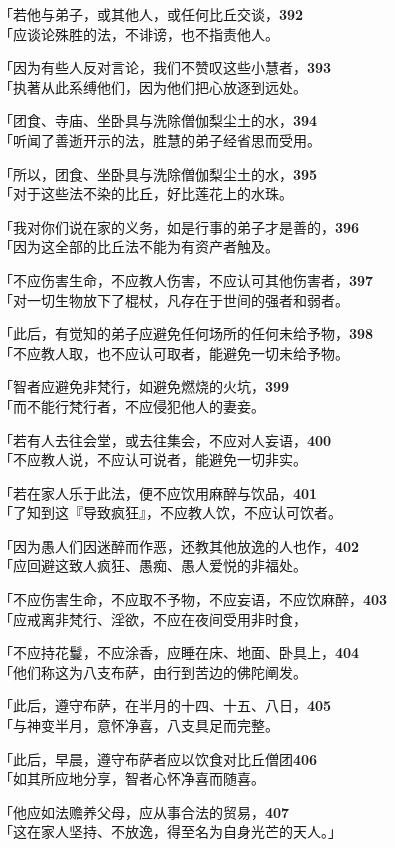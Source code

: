 「若他与弟子，或其他人，或任何比丘交谈，\hfill{\grayfootnotesize \textbf{392}} \\
「应谈论殊胜的法，不诽谤，也不指责他人。


「因为有些人反对言论，我们不赞叹这些小慧者，\hfill{\grayfootnotesize \textbf{393}} \\
「执著从此系缚他们，因为他们把心放逐到远处。


「团食、寺庙、坐卧具与洗除僧伽梨尘土的水，\hfill{\grayfootnotesize \textbf{394}} \\
「听闻了善逝开示的法，胜慧的弟子经省思而受用。


「所以，团食、坐卧具与洗除僧伽梨尘土的水，\hfill{\grayfootnotesize \textbf{395}} \\
「对于这些法不染的比丘，好比莲花上的水珠。


「我对你们说在家的义务，如是行事的弟子才是善的，\hfill{\grayfootnotesize \textbf{396}} \\
「因为这全部的比丘法不能为有资产者触及。


「不应伤害生命，不应教人伤害，不应认可其他伤害者，\hfill{\grayfootnotesize \textbf{397}} \\
「对一切生物放下了棍杖，凡存在于世间的强者和弱者。


「此后，有觉知的弟子应避免任何场所的任何未给予物，\hfill{\grayfootnotesize \textbf{398}} \\
「不应教人取，也不应认可取者，能避免一切未给予物。


「智者应避免非梵行，如避免燃烧的火坑，\hfill{\grayfootnotesize \textbf{399}} \\
「而不能行梵行者，不应侵犯他人的妻妾。


「若有人去往会堂，或去往集会，不应对人妄语，\hfill{\grayfootnotesize \textbf{400}} \\
「不应教人说，不应认可说者，能避免一切非实。


「若在家人乐于此法，便不应饮用麻醉与饮品，\hfill{\grayfootnotesize \textbf{401}} \\
「了知到这『导致疯狂』，不应教人饮，不应认可饮者。


「因为愚人们因迷醉而作恶，还教其他放逸的人也作，\hfill{\grayfootnotesize \textbf{402}} \\
「应回避这致人疯狂、愚痴、愚人爱悦的非福处。


「不应伤害生命，不应取不予物，不应妄语，不应饮麻醉，\hfill{\grayfootnotesize \textbf{403}} \\
「应戒离非梵行、淫欲，不应在夜间受用非时食，


「不应持花鬘，不应涂香，应睡在床、地面、卧具上，\hfill{\grayfootnotesize \textbf{404}} \\
「他们称这为八支布萨，由行到苦边的佛陀阐发。


「此后，遵守布萨，在半月的十四、十五、八日，\hfill{\grayfootnotesize \textbf{405}} \\
「与神变半月，意怀净喜，八支具足而完整。


「此后，早晨，遵守布萨者应以饮食对比丘僧团\hfill{\grayfootnotesize \textbf{406}} \\
「如其所应地分享，智者心怀净喜而随喜。


「他应如法赡养父母，应从事合法的贸易，\hfill{\grayfootnotesize \textbf{407}} \\
「这在家人坚持、不放逸，得至名为自身光芒的天人。」
